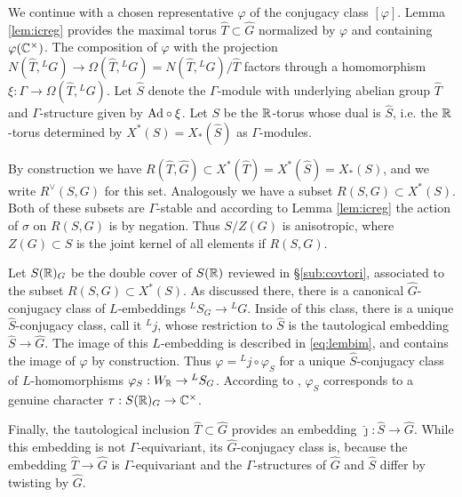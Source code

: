 \documentclass{article}
\theoremstyle{definition}
\numberwithin{equation}{section}
\renewcommand{\-}{\hyp{}}
\begin{document}
We continue with a chosen representative $\varphi$ of the conjugacy class $[\varphi]$. Lemma \ref{lem:icreg} provides the maximal torus $\hat T \subset \hat G$ normalized by $\varphi$ and containing $\varphi(\mathbb{C}^\times)$.
%
%
The composition of $\varphi$ with the projection $N(\hat T,{^LG}) \to \Omega(\hat T,{^LG})=N(\hat T,{^LG})/\hat T$ factors through a homomorphism $\xi : \Gamma \to \Omega(\hat T,{^LG})$. Let $\hat S$ denote the $\Gamma$-module with underlying abelian group $\hat T$ and $\Gamma$-structure given by $\textrm{Ad}\circ\xi$. Let $S$ be the $\mathbb{R}$-torus whose dual is $\hat S$, i.e. the $\mathbb{R}$-torus determined by $X^*(S)=X_*(\hat S)$ as $\Gamma$-modules.


By construction we have $R(\hat T,\hat G) \subset X^*(\hat T)=X^*(\hat S)=X_*(S)$, and we write $R^\vee(S,G)$ for this set. Analogously we have a subset $R(S,G) \subset X^*(S)$. Both of these subsets are $\Gamma$-stable and according to Lemma \ref{lem:icreg} the action of $\sigma$ on $R(S,G)$ is by negation. Thus $S/Z(G)$ is anisotropic, where $Z(G) \subset S$ is the joint kernel of all elements if $R(S,G)$.

Let $S(\mathbb{R})_G$ be the double cover of $S(\mathbb{R})$ reviewed in \S\ref{sub:covtori}, associated to the subset $R(S,G) \subset X^*(S)$. As discussed there, there is a canonical $\hat G$-conjugacy class of $L$\-embeddings $^LS_G \to {^LG}$. Inside of this class, there is a unique $\hat S$-conjugacy class, call it $^Lj$, whose restriction to $\hat S$ is the tautological embedding $\hat S \to \hat G$. The image of this $L$\-embedding is described in \eqref{eq:lembim}, and contains the image of $\varphi$ by construction. Thus $\varphi = {^Lj}\circ\varphi_S$ for a unique $\hat S$-conjugacy class of $L$\-homomorphisms $\varphi_S : W_{\mathbb{R}} \to {^LS_G}$. According to \cite[Theorem 3.15]{KalDC}, $\varphi_S$ corresponds to a genuine character $\tau : S(\mathbb{R})_G \to \mathbb{C}^\times$.

Finally, the tautological inclusion $\hat T \subset \hat G$ provides an embedding $\hat\jmath : \hat S \to \hat G$. While this embedding is not $\Gamma$-equivariant, its $\hat G$-conjugacy class is, because the embedding $\hat T \to \hat G$ is $\Gamma$-equivariant and the $\Gamma$-structures of $\hat G$ and $\hat S$ differ by twisting by $\hat G$.
\end{document}
